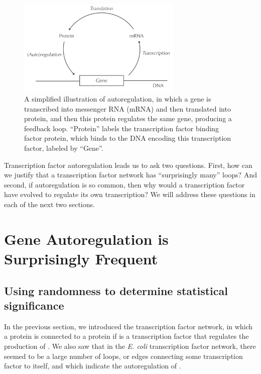 \begin{figure}[h]
\centering
\mySfFamily
\includegraphics[width = 0.7\textwidth]{../images/autoregulation_example.png}
\caption{A simplified illustration of autoregulation, in which a gene is transcribed into messenger RNA (mRNA) and then translated into protein, and then this protein regulates the same gene, producing a feedback loop. ``Protein'' labels the transcription factor binding factor protein, which binds to the DNA encoding this transcription factor, labeled by ``Gene''.}
\label{fig:autoregulation_example}
\end{figure}

Transcription factor autoregulation leads us to ask two questions. First, how can we justify that a transcription factor network has ``surprisingly many'' loops? And second, if autoregulation is so common, then why would a transcription factor have evolved to regulate its own transcription? We will address these questions in each of the next two sections.


\FloatBarrier
{}

\section{Gene Autoregulation is Surprisingly Frequent}
\label{sec:gene_autoregulation_is_surprisingly_frequent}

\subsection{Using randomness to determine statistical significance}

In the previous section, we introduced the transcription factor network, in which a protein  is connected to a protein  if  is a transcription factor that regulates the production of . We also saw that in the \textit{E. coli} transcription factor network, there seemed to be a large number of loops, or edges connecting some transcription factor  to itself, and which indicate the autoregulation of .

